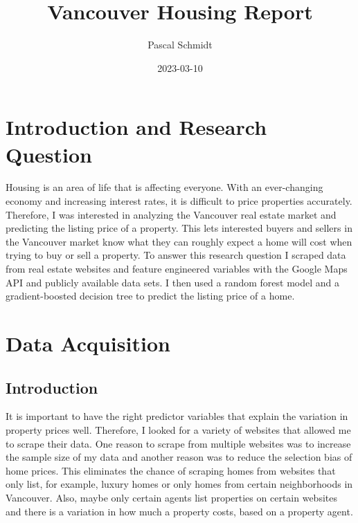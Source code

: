 \documentclass[
]{article}
\title{Vancouver Housing Report}
\author{Pascal Schmidt}
\date{2023-03-10}
\begin{document}
\maketitle

{
\hypersetup{linkcolor=}
\setcounter{tocdepth}{2}
\tableofcontents
}
\newpage

\hypertarget{introduction-and-research-question}{%
\section{Introduction and Research
Question}\label{introduction-and-research-question}}

Housing is an area of life that is affecting everyone. With an
ever-changing economy and increasing interest rates, it is difficult to
price properties accurately. Therefore, I was interested in analyzing
the Vancouver real estate market and predicting the listing price of a
property. This lets interested buyers and sellers in the Vancouver
market know what they can roughly expect a home will cost when trying to
buy or sell a property. To answer this research question I scraped data
from real estate websites and feature engineered variables with the
Google Maps API and publicly available data sets. I then used a random
forest model and a gradient-boosted decision tree to predict the listing
price of a home.

\hypertarget{data-acquisition}{%
\section{Data Acquisition}\label{data-acquisition}}

\hypertarget{introduction}{%
\subsection{Introduction}\label{introduction}}

It is important to have the right predictor variables that explain the
variation in property prices well. Therefore, I looked for a variety of
websites that allowed me to scrape their data. One reason to scrape from
multiple websites was to increase the sample size of my data and another
reason was to reduce the selection bias of home prices. This eliminates
the chance of scraping homes from websites that only list, for example,
luxury homes or only homes from certain neighborhoods in Vancouver.
Also, maybe only certain agents list properties on certain websites and
there is a variation in how much a property costs, based on a property
agent.
\end{document}
